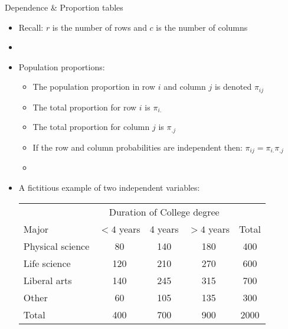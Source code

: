 \documentclass[xcolor=dvipsnames]{beamer}
\begin{document}
\begin{frame}{Dependence \& Proportion tables}
\begin{itemize}
	\item Recall: $r$ is the number of rows and $c$ is the number of columns  \pause
	\item[]
	\item Population proportions:  \pause
	\begin{itemize}
		\item The population proportion in row $i$ and column $j$ is denoted $\pi_{ij}$  \pause
		\item The total proportion for row $i$ is $\pi_{i.}$  \pause
		\item The total proportion for column $j$ is $\pi_{.j}$  \pause
		\item If the row and column probabilities are independent then: $\pi_{ij}=\pi_{i.}\pi_{.j}$  \pause
		\item[]
	\end{itemize}
	\item A fictitious example of two independent variables:  \pause
	\begin{center}
		\begin{tabular}{|l|ccc|c|}
			\hline
			& \multicolumn{3}{c|}{Duration of College degree} & \\
			Major & $<4$ years & 4 years & $>4$ years & Total \\ \hline
			Physical science & 80 & 140 & 180 & 400 \\ 
			Life science & 120 & 210 & 270 & 600 \\
			Liberal arts & 140 & 245 & 315 & 700\\ 
			Other & 60 & 105 & 135 & 300 \\ \hline
			Total & 400 & 700 & 900 & 2000\\ \hline
		\end{tabular}
	\end{center}
\end{itemize}
\end{frame}
\end{document}

